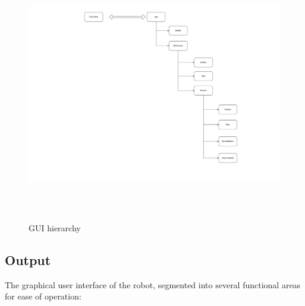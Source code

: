 \documentclass[a4paper,12pt]{extreport}
\begin{document}
\begin{figure}[h!]
    \centering
    \includegraphics[width=6.26806in,height=4.42986in]{img/image001.png}
    \caption{GUI hierarchy}
    \label{judFig1}
    \end{figure}
    
    \subsection{Output}
    The graphical user interface of the robot, segmented into several
    functional areas for ease of operation:
    
\end{document}
